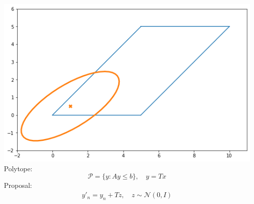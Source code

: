 \begin{frame}[t]
\begin{columns}
        \begin{column}{0.3\textwidth}
            \includegraphics[width=\textwidth]{imgs/polytope-preconditioning.png}
            Polytope:
            \[
                \mathcal{P} = \{ y : Ay \leq b \}, \quad y = Tx
            \]
            Proposal:
            \begin{align*}
                y'_{n} = y_n + Tz, \quad z \sim \mathcal{N}(0,I)
            \end{align*}
        \end{column}
	\end{columns}
\end{frame}

